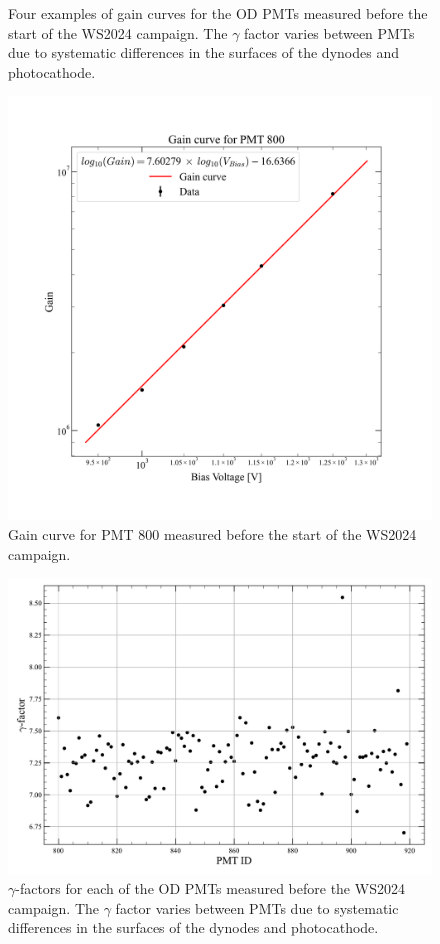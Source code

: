 \begin{figure}[ht!]
\begin{subfigure}[b]{0.47\textwidth}
     \end{subfigure}
        \caption{Four examples of gain curves for the OD PMTs measured before the start of the WS2024 campaign. The $\gamma$ factor varies between PMTs due to systematic differences in the surfaces of the dynodes and photocathode.}
        \label{fig:ODCommissioning/gainCurve}
\end{figure}

\begin{figure}[ht!]
    \centering
    \includegraphics[width=0.7\linewidth]{figures/ODCommissioning/PMT800_GainCurve.png}
    \caption{Gain curve for PMT 800 measured before the start of the WS2024 campaign.}
    \label{fig:ODCommissioning/PMT800_gainCurve}
\end{figure}

\begin{figure}[ht!]
    \centering
    \includegraphics[width=0.7\linewidth]{figures/ODCommissioning/gammaFactorScatterPlot.pdf}
    \caption{$\gamma$-factors for each of the OD PMTs measured before the WS2024 campaign. The $\gamma$ factor varies between PMTs due to systematic differences in the surfaces of the dynodes and photocathode.}
    \label{fig:ODCommissioning/gammaFactors}
\end{figure}


